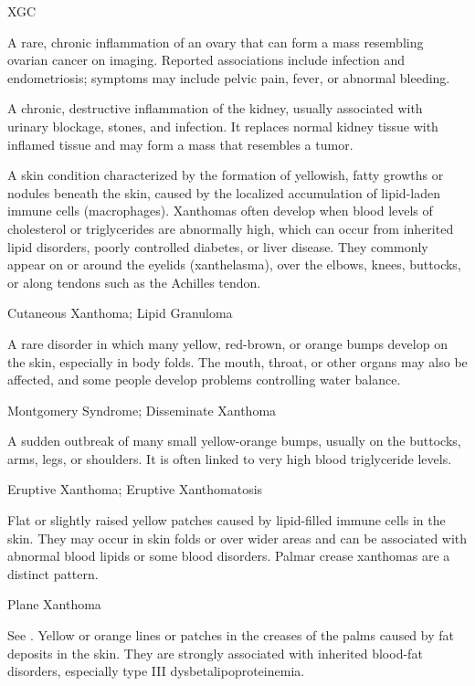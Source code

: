 \synonyms
XGC

 A rare, chronic inflammation of an ovary that can form a mass resembling ovarian cancer on imaging. Reported associations include infection and endometriosis; symptoms may include pelvic pain, fever, or abnormal bleeding.

 A chronic, destructive inflammation of the kidney, usually associated with urinary blockage, stones, and infection. It replaces normal kidney tissue with inflamed tissue and may form a mass that resembles a tumor.

 A skin condition characterized by the formation of yellowish, fatty growths or nodules beneath the skin, caused by the localized accumulation of lipid-laden immune cells (macrophages). Xanthomas often develop when blood levels of cholesterol or triglycerides are abnormally high, which can occur from inherited lipid disorders, poorly controlled diabetes, or liver disease. They commonly appear on or around the eyelids (xanthelasma), over the elbows, knees, buttocks, or along tendons such as the Achilles tendon.

\synonyms
Cutaneous Xanthoma; Lipid Granuloma

 A rare disorder in which many yellow, red-brown, or orange bumps develop on the skin, especially in body folds. The mouth, throat, or other organs may also be affected, and some people develop problems controlling water balance.

\synonyms
Montgomery Syndrome; Disseminate Xanthoma

 A sudden outbreak of many small yellow-orange bumps, usually on the buttocks, arms, legs, or shoulders. It is often linked to very high blood triglyceride levels.

\synonyms
Eruptive Xanthoma; Eruptive Xanthomatosis

 Flat or slightly raised yellow patches caused by lipid-filled immune cells in the skin. They may occur in skin folds or over wider areas and can be associated with abnormal blood lipids or some blood disorders. Palmar crease xanthomas are a distinct pattern.

\synonyms
Plane Xanthoma

 See .
 Yellow or orange lines or patches in the creases of the palms caused by fat deposits in the skin. They are strongly associated with inherited blood-fat disorders, especially type III dysbetalipoproteinemia.


